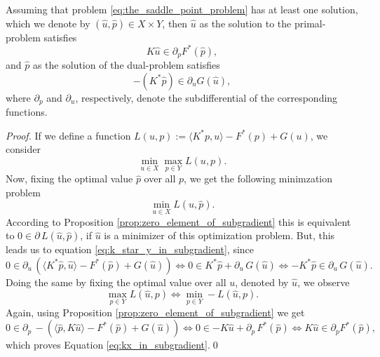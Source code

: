     Assuming that problem \ref{eq:the_saddle_point_problem} has at least one solution, which we denote by $(\hat{u}, \hat{p}) \in X \times Y$, then $\hat{u}$ as the solution to the primal-problem satisfies
        \begin{equation}
            K\hat{u} \in \partial_{p} F^{\ast}(\hat{p}),
            \label{eq:kx_in_subgradient}
        \end{equation}
    and $\hat{p}$ as the solution of the dual-problem satisfies
        \begin{equation}
            -(K^{\ast}\hat{p}) \in \partial_{u} G(\hat{u}),
            \label{eq:k_star_y_in_subgradient}
        \end{equation}
    where $\partial_{p}$ and $\partial_{u}$, respectively, denote the subdifferential of the corresponding functions.
        
    \begin{proof}
        If we define a function $L(u, p) := \langle K^{\ast}p, u \rangle - F^{\ast}(p) + G(u)$, we consider
            $$
                \min_{u \in X} \max_{p \in Y} L(u, p).
            $$
        Now, fixing the optimal value $\hat{p}$ over all $p$, we get the following minimzation problem
            $$
                \min_{u \in X} L(u, \hat{p}).
            $$
        According to Proposition \ref{prop:zero_element_of_subgradient} this is equivalent to $0 \in \partial\,L(\hat{u}, \hat{p})$, if $\hat{u}$ is a minimizer of this optimization problem. But, this leads us to equation \ref{eq:k_star_y_in_subgradient}, since
            $$
                0 \in \partial_{u} \, (\langle K^{\ast}\hat{p}, \hat{u} \rangle - F^{\ast}(\hat{p}) + G(\hat{u})) \Longleftrightarrow 0 \in K^{\ast}\hat{p} + \partial_{u} \, G(\hat{u}) \Longleftrightarrow -K^{\ast}\hat{p} \in \partial_{u} \, G(\hat{u}).
            $$
        Doing the same by fixing the optimal value over all $u$, denoted by $\hat{u}$, we observe
            $$
                \max_{p \in Y} L(\hat{u}, p) \Longleftrightarrow \min_{p \in Y} -L(\hat{u}, p).
            $$
        Again, using Proposition \ref{prop:zero_element_of_subgradient} we get
            $$
                0 \in \partial_{p} \, -(\langle \hat{p}, K\hat{u} \rangle - F^{\ast}(\hat{p}) + G(\hat{u})) \Longleftrightarrow 0 \in -K\hat{u} + \partial_{p} \, F^{\ast}(\hat{p}) \Longleftrightarrow K\hat{u} \in \partial_{p} F^{\ast}(\hat{p}),
            $$
        which proves Equation \ref{eq:kx_in_subgradient}.\qed
    \end{proof}

